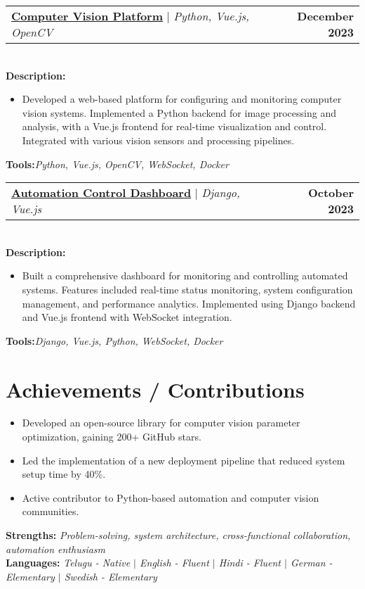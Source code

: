 \documentclass[letterpaper,11pt]{article}
\makeatletter
\newcommand{\resumeItem}[1]{
  \item\small{
    {#1 \vspace{-2pt}}
  }
}
\newcommand{\resumeProjectHeading}[2]{
    \item
    \begin{tabular*}{1.001\textwidth}{l@{\extracolsep{\fill}}r}
      \small#1 & \textbf{\small #2}\\
    \end{tabular*}\vspace{-7pt}
}
\newcommand{\resumeSubHeadingListStart}{\begin{itemize}[leftmargin=0.0in, label={}]}
\newcommand{\resumeSubHeadingListEnd}{\end{itemize}}
\newcommand{\resumeItemListStart}{\begin{itemize}}
\newcommand{\resumeItemListEnd}{\end{itemize}\vspace{-5pt}}
\makeatother
\begin{document}
\resumeProjectHeading
{\textbf{\href{https://github.com/yakkshit/vision-platform}{Computer Vision Platform}} $|$ \emph{Python, Vue.js, OpenCV}}{December 2023}\\
\vspace{6pt}
\textbf{Description:}
\resumeItemListStart
\resumeItem{Developed a web-based platform for configuring and monitoring computer vision systems. Implemented a Python backend for image processing and analysis, with a Vue.js frontend for real-time visualization and control. Integrated with various vision sensors and processing pipelines.}
\resumeItemListEnd
\vspace{4pt}
\textbf{Tools:}\emph{Python, Vue.js, OpenCV, WebSocket, Docker}
\vspace{-5pt}
\resumeProjectHeading
{\href{https://github.com/yakkshit/automation-dashboard}{\textbf{Automation Control Dashboard}} $|$ \emph{Django, Vue.js}}{October 2023}\\
\vspace{6pt}
\textbf{Description:}
\resumeItemListStart
\resumeItem{Built a comprehensive dashboard for monitoring and controlling automated systems. Features included real-time status monitoring, system configuration management, and performance analytics. Implemented using Django backend and Vue.js frontend with WebSocket integration.}
\resumeItemListEnd
\vspace{4pt}
\textbf{Tools:}\emph{Django, Vue.js, Python, WebSocket, Docker}

\section{Achievements / Contributions}
\resumeSubHeadingListStart
\resumeItemListStart
\resumeItem{Developed an open-source library for computer vision parameter optimization, gaining 200+ GitHub stars.}
\resumeItem{Led the implementation of a new deployment pipeline that reduced system setup time by 40\%.}
\resumeItem{Active contributor to Python-based automation and computer vision communities.}
\resumeItemListEnd

\resumeSubHeadingListEnd
\textbf{Strengths: }\emph{Problem-solving, system architecture, cross-functional collaboration, automation enthusiasm} \\
\textbf{Languages: }\emph{Telugu - Native $|$ English - Fluent $|$ Hindi - Fluent $|$ German - Elementary $|$ Swedish - Elementary}

\vspace{10pt}
\end{document}
